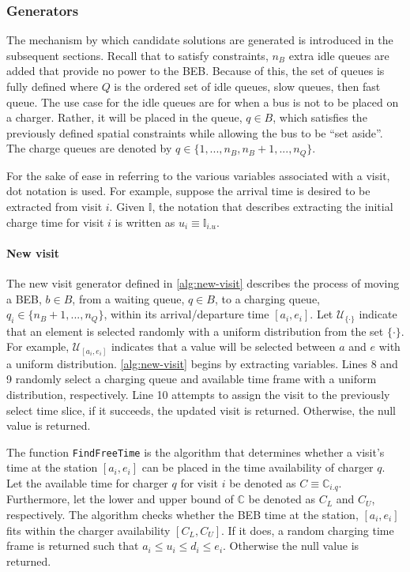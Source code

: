\documentclass[energies,article,submit,moreauthors]{Definitions/mdpi}
\newcommand{\I}{\mathbb{I}}                 %
\newcommand{\C}{\mathbb{C}}                 %
\newcommand{\U}{\mathcal{U}}                %
\begin{document}
\subsubsection{Generators}
\label{sec:sa-generators}
The mechanism by which candidate solutions are generated is introduced in the subsequent sections. Recall that to
satisfy constraints, \(n_B\) extra idle queues are added that provide no power to the BEB. Because of this, the set of
queues is fully defined where \(Q\) is the ordered set of idle queues, slow queues, then fast queue. The use case for the
idle queues are for when a bus is not to be placed on a charger. Rather, it will be placed in the queue, \(q \in B\), which
satisfies the previously defined spatial constraints while allowing the bus to be ``set aside''. The charge queues are
denoted by \(q \in \{1, ..., n_B , n_B + 1, ..., n_Q\}\).

For the sake of ease in referring to the various variables associated with a visit, dot notation is used. For example,
suppose the arrival time is desired to be extracted from visit \(i\). Given \(\I\), the notation that describes extracting
the initial charge time for visit \(i\) is written as \(u_i \equiv \I_{i.u}\).

\paragraph{New visit}
\label{sec:sa-new-visit}
The new visit generator defined in \ref{alg:new-visit} describes the process of moving a BEB, \(b \in B\), from a waiting
queue, \(q \in B\), to a charging queue, \(q_i \in \{n_B + 1, ..., n_Q\}\), within its arrival/departure time \([a_i, e_i]\). Let
\(\U_{\{\cdot\}}\) indicate that an element is selected randomly with a uniform distribution from the set \(\{\cdot\}\). For
example, \(\U_{[a_i, e_i]}\) indicates that a value will be selected between \(a\) and \(e\) with a uniform distribution.
\ref{alg:new-visit} begins by extracting variables. Lines 8 and 9 randomly select a charging queue and available time
frame with a uniform distribution, respectively. Line 10 attempts to assign the visit to the previously select time
slice, if it succeeds, the updated visit is returned. Otherwise, the null value is returned.

The function \texttt{FindFreeTime} is the algorithm that determines whether a visit's time at the station \([a_i, e_i]\) can be placed
in the time availability of charger \(q\). Let the available time for charger \(q\) for visit \(i\) be denoted as \(C \equiv
\C_{i.q}\). Furthermore, let the lower and upper bound of \(\C\) be denoted as \(C_L\) and \(C_U\), respectively. The algorithm
checks whether the BEB time at the station, \([a_i, e_i]\) fits within the charger availability \([C_L, C_U]\). If it does,
a random charging time frame is returned such that \(a_i \le u_i \le d_i \le e_i\). Otherwise the null value is returned.
\end{document}

